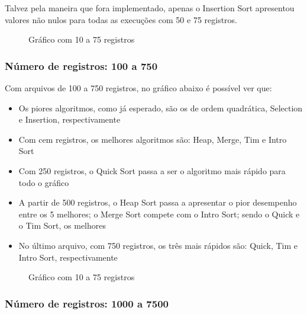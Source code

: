 \documentclass[a4paper,12pt]{scrartcl}
\begin{document}
Talvez pela maneira que fora implementado, apenas o Insertion Sort apresentou valores não nulos para todas as execuções com 50 e 75 registros.

\begin{figure}[H]
    \centering
    
    \caption{Gráfico com 10 a 75 registros}
    \label{mapaSelect}
\end{figure}

\subsubsection{Número de registros: 100 a 750}

Com arquivos de 100 a 750 registros, no gráfico abaixo é possível ver que:

\begin{itemize}
    \item
    Os piores algoritmos, como já esperado, são os de ordem quadrática, Selection e Insertion, respectivamente
    
    \item
    Com cem registros, os melhores algoritmos são: Heap, Merge, Tim e Intro Sort
    
    \item
    Com 250 registros, o Quick Sort passa a ser o algoritmo mais rápido para todo o gráfico
    
    \item
    A partir de 500 registros, o Heap Sort passa a apresentar o pior desempenho entre os 5 melhores; o Merge Sort compete com o Intro Sort; sendo o Quick e o Tim Sort, os melhores
    
    \item
    No último arquivo, com 750 registros, os três mais rápidos são: Quick, Tim e Intro Sort, respectivamente
    
\end{itemize}

\begin{figure}[H]
    \centering
    
    \caption{Gráfico com 10 a 75 registros}
    \label{mapaSelect}
\end{figure}

\subsubsection{Número de registros: 1000 a 7500}
\end{document}
